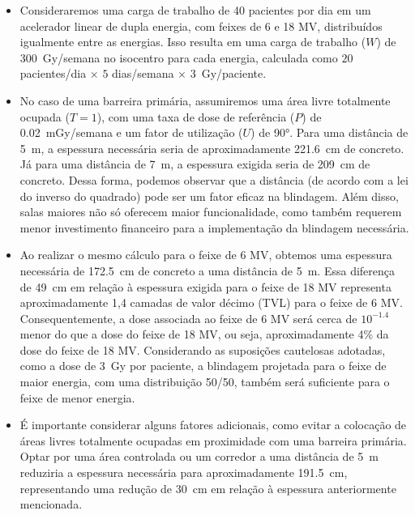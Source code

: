 \documentclass[11pt,a4paper]{article}
\begin{document}
	\begin{tcolorbox}[width=\textwidth, colback={white}, colbacktitle={DarkTurquoise!50!white},title={$\bigstar$ \LobsterTwo{Cálculo de Blindagem MV} $\bigstar $}, coltitle={CarnationPink}, colframe={DarkTurquoise}, fonttitle=\rmfamily\bfseries\Large, breakable]

		\begin{itemize}[label=\textcolor{CarnationPink}{$\star$}]
			\item Consideraremos uma carga de trabalho de 40 pacientes por dia em um acelerador linear de dupla energia, com feixes de 6 e 18 MV, distribuídos igualmente entre as energias. Isso resulta em uma carga de trabalho (\(W\)) de \SI{300}{\gray}/semana no isocentro para cada energia, calculada como \(20\) pacientes/dia \(\times\) \(5\) dias/semana \(\times\) \SI{3}{\gray}/paciente.
			\item No caso de uma barreira primária, assumiremos uma área livre totalmente ocupada (\(T = 1\)), com uma taxa de dose de referência (\(P\)) de \SI{0.02}{\milli\gray}/semana e um fator de utilização (\(U\)) de \ang{90}. Para uma distância de \SI{5}{\meter}, a espessura necessária seria de aproximadamente \SI{221.6}{\centi\meter} de concreto. Já para uma distância de \SI{7}{\meter}, a espessura exigida seria de \SI{209}{\centi\meter} de concreto. Dessa forma, podemos observar que a distância (de acordo com a lei do inverso do quadrado) pode ser um fator eficaz na blindagem. Além disso, salas maiores não só oferecem maior funcionalidade, como também requerem menor investimento financeiro para a implementação da blindagem necessária.
			\item Ao realizar o mesmo cálculo para o feixe de 6 MV, obtemos uma espessura necessária de \SI{172.5}{\centi\meter} de concreto a uma distância de \SI{5}{\meter}. Essa diferença de \SI{49}{\centi\meter} em relação à espessura exigida para o feixe de 18 MV representa aproximadamente 1,4 camadas de valor décimo (TVL) para o feixe de 6 MV. Consequentemente, a dose associada ao feixe de 6 MV será cerca de \(10^{-1.4}\) menor do que a dose do feixe de 18 MV, ou seja, aproximadamente 4\% da dose do feixe de 18 MV. Considerando as suposições cautelosas adotadas, como a dose de \SI{3}{\gray} por paciente, a blindagem projetada para o feixe de maior energia, com uma distribuição 50/50, também será suficiente para o feixe de menor energia.
			\item É importante considerar alguns fatores adicionais, como evitar a colocação de áreas livres totalmente ocupadas em proximidade com uma barreira primária. Optar por uma área controlada ou um corredor a uma distância de \SI{5}{\meter} reduziria a espessura necessária para aproximadamente \SI{191.5}{\centi\meter}, representando uma redução de \SI{30}{\centi\meter} em relação à espessura anteriormente mencionada.

\end{itemize}
\end{tcolorbox}
\end{document}
